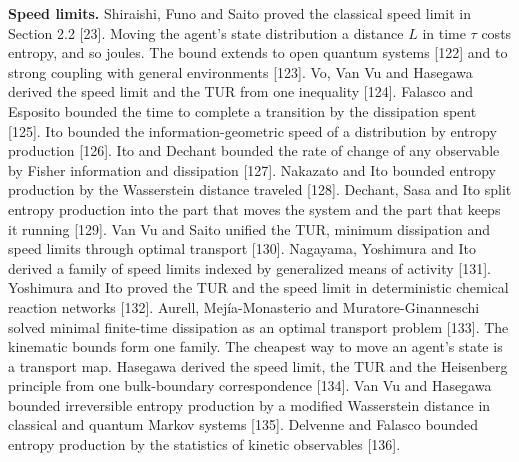 \documentclass[
  10pt,
]{article}
\begin{document}
\textbf{Speed limits.} Shiraishi, Funo and Saito proved the classical
speed limit in Section 2.2 {[}23{]}. Moving the agent's state
distribution a distance \(L\) in time \(\tau\) costs entropy, and so
joules. The bound extends to open quantum systems {[}122{]} and to
strong coupling with general environments {[}123{]}. Vo, Van Vu and
Hasegawa derived the speed limit and the TUR from one inequality
{[}124{]}. Falasco and Esposito bounded the time to complete a
transition by the dissipation spent {[}125{]}. Ito bounded the
information-geometric speed of a distribution by entropy production
{[}126{]}. Ito and Dechant bounded the rate of change of any observable
by Fisher information and dissipation {[}127{]}. Nakazato and Ito
bounded entropy production by the Wasserstein distance traveled
{[}128{]}. Dechant, Sasa and Ito split entropy production into the part
that moves the system and the part that keeps it running {[}129{]}. Van
Vu and Saito unified the TUR, minimum dissipation and speed limits
through optimal transport {[}130{]}. Nagayama, Yoshimura and Ito derived
a family of speed limits indexed by generalized means of activity
{[}131{]}. Yoshimura and Ito proved the TUR and the speed limit in
deterministic chemical reaction networks {[}132{]}. Aurell,
Mejía-Monasterio and Muratore-Ginanneschi solved minimal finite-time
dissipation as an optimal transport problem {[}133{]}. The kinematic
bounds form one family. The cheapest way to move an agent's state is a
transport map. Hasegawa derived the speed limit, the TUR and the
Heisenberg principle from one bulk-boundary correspondence {[}134{]}.
Van Vu and Hasegawa bounded irreversible entropy production by a
modified Wasserstein distance in classical and quantum Markov systems
{[}135{]}. Delvenne and Falasco bounded entropy production by the
statistics of kinetic observables {[}136{]}.
\end{document}
